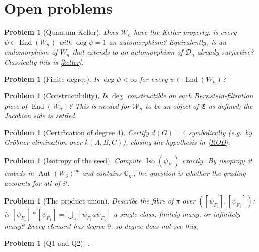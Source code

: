\documentclass[11pt]{article}
\theoremstyle{change}
\newtheorem{problem}[equation]{Problem}
\theoremstyle{nonumberplain}
\newcommand\GG{{\mathbb G}}
\newcommand\cW{{\mathcal W}}
\newcommand\cD{{\mathcal D}}
\newcommand\fE{{\mathfrak E}}
\DeclareMathOperator{\End}{End}
\DeclareMathOperator{\Aut}{Aut}
\DeclareMathOperator{\Iso}{Iso}
\begin{document}
\section{Open problems}

\begin{problem}[Quantum Keller\label{qkeller}]
Does $\cW_n$ have the Keller property: is every $\psi \in \End(W_n)$ with $\deg \psi = 1$ an automorphism? Equivalently, is an endomorphism of $W_n$ that extends to an automorphism of $\cD_n$ already surjective? Classically this is \cref{keller}.
\end{problem}

\begin{problem}[Finite degree\label{finite}]
Is $\deg \psi < \infty$ for every $\psi \in \End(W_n)$?
\end{problem}

\begin{problem}[Constructibility\label{constrprob}]
Is $\deg$ constructible on each Bernstein-filtration piece of $\End(W_n)$? This is needed for $\cW_n$ to be an object of $\fE$ as defined; the Jacobian side is settled.
\end{problem}

\begin{problem}[Certification of degree $4$]
Certify $d(G) = 4$ symbolically (e.g.\ by Gr\"obner elimination over $k(A,B,C)$), closing the hypothesis in \cref{ROD}.
\end{problem}

\begin{problem}[Isotropy of the seed\label{isoproblem}]
Compute $\Iso(\psi_{F_1})$ exactly. By \cref{isoprop} it embeds in $\Aut(W_3)^{op}$ and contains $\GG_m$; the question is whether the grading accounts for all of it.
\end{problem}

\begin{problem}[The product union]
Describe the fibre of $\pi$ over $([\psi_{F_1}], [\psi_{F_1}])$: is $[\psi_{F_1}] * [\psi_{F_1}] = \bigcup_a [\psi_{F_1} a \psi_{F_1}]$ a single class, finitely many, or infinitely many? Every element has degree $9$, so degree does not see this.
\end{problem}

\begin{problem}[Q1 and Q2]
.
\end{problem}
\end{document}
